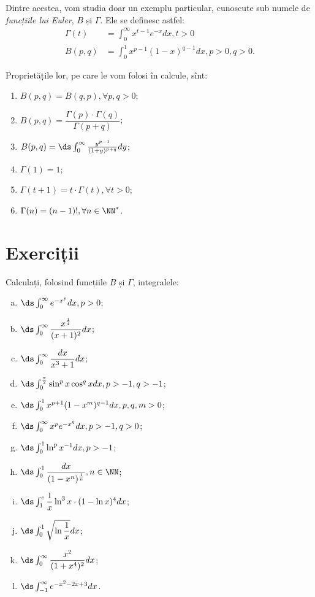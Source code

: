 Dintre acestea, vom studia doar un exemplu particular, cunoscute sub numele
de \emph{funcțiile lui Euler}, $ B $ și $ \Gamma $. Ele se definesc astfel:
\begin{align*}
  \Gamma(t) &= \int_0^\infty x^{t - 1} e^{-x} dx, t > 0 \\
  B(p, q) &= \int_0^1 x^{p-1} (1 - x)^{q - 1} dx, p > 0, q > 0.
\end{align*}

Proprietățile lor, pe care le vom folosi în calcule, sînt:
\begin{enumerate}[(1)]
\item $ B(p, q) = B(q, p), \forall p, q > 0 $;
\item $ B(p, q) = \dfrac{\Gamma(p) \cdot \Gamma(q)}{\Gamma(p + q)} $;
\item $ B(p, q) = \ds\int_0^\infty \frac{y^{p - 1}}{(1 + y)^{p + q}} dy $;
\item $ \Gamma(1) = 1 $;
\item $ \Gamma(t + 1) = t \cdot \Gamma(t), \forall t > 0 $;
\item $ \Gamma(n) = (n - 1)!, \forall n \in \NN^\ast $.
\end{enumerate}


\section{Exerciții}

Calculați, folosind funcțiile $ B $ și $ \Gamma $, integralele:
\begin{enumerate}[(a)]
\item $ \ds\int_0^\infty e^{-x^p} dx, p > 0 $;
\item $ \ds\int_0^\infty \dfrac{x^{\frac{1}{4}}}{(x + 1)^2} dx $;
\item $ \ds\int_0^\infty \dfrac{dx}{x^3 + 1} dx $;
\item $ \ds\int_0^{\frac{\pi}{2}} \sin^p x \cos^q x dx, p > -1, q > -1 $;
\item $ \ds\int_0^1 x^{p + 1}(1 - x^m)^{q - 1} dx, p, q, m > 0 $;
\item $ \ds\int_0^\infty x^p e^{-x^q} dx, p > -1, q > 0 $;
\item $ \ds\int_0^1 \ln^p x^{-1} dx, p > -1 $;
\item $ \ds\int_0^1 \dfrac{dx}{(1 - x^n)^{\frac{1}{n}}}, n \in \NN $;
\item $ \ds\int_1^e \dfrac{1}{x} \ln^3 x \cdot (1 - \ln x)^4 dx $;
\item $ \ds\int_0^1 \sqrt{\ln\dfrac{1}{x}} dx $;
\item $ \ds\int_0^\infty \dfrac{x^2}{(1 + x^4)^2} dx $;
\item $ \ds\int_{-1}^\infty e^{-x^2 - 2x + 3} dx $.
\end{enumerate}


